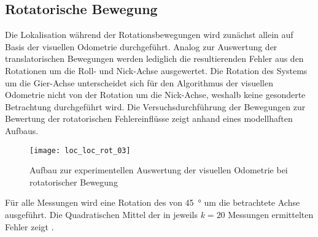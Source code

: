 \subsection{Rotatorische Bewegung}

Die Lokalisation während der Rotationsbewegungen wird zunächst allein auf Basis der visuellen Odometrie durchgeführt. Analog zur Auswertung der translatorischen Bewegungen werden lediglich die resultierenden Fehler aus den Rotationen um die Roll- und Nick-Achse ausgewertet. Die Rotation des Systems um die Gier-Achse unterscheidet sich für den Algorithmus der visuellen Odometrie nicht von der Rotation um die Nick-Achse, weshalb keine gesonderte Betrachtung durchgeführt wird. Die Versuchsdurchführung der Bewegungen zur Bewertung der rotatorischen Fehlereinflüsse zeigt  anhand eines modellhaften Aufbaus.\\

\begin{figure}[!ht]
	\begin{center}
		\texttt{[image: loc\_loc\_rot\_03]}
		\caption{Aufbau zur experimentellen Auswertung der visuellen Odometrie bei rotatorischer Bewegung}
		\label{fig.rotmove}
	\end{center}
\end{figure}

Für alle Messungen wird eine Rotation des  von \SI{45}{°} um die betrachtete Achse ausgeführt. Die Quadratischen Mittel der in jeweils $k=20$ Messungen ermittelten Fehler zeigt .

